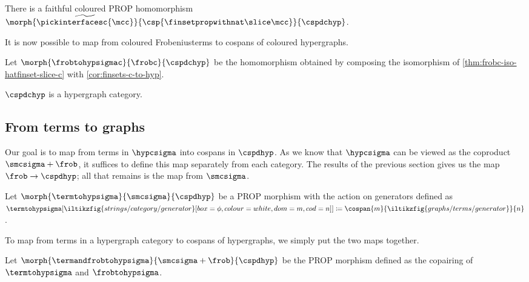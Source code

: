 \begin{corollary}\label{cor:finsets-c-to-hyp}
    There is a faithful coloured PROP homomorphism \(
    \morph{
        \widetilde{\pickinterfacesc{\mcc}}
    }{
        \csp{\finsetpropwithnat \slice \mcc}
    }{
        \cspdchyp
    }
    \).
\end{corollary}

It is now possible to map from coloured Frobeniusterms to cospans of coloured
hypergraphs.

\begin{definition}
    Let \(\morph{\frobtohypsigmac}{\frobc}{\cspdchyp}\) be the homomorphism
    obtained by composing the isomorphism of \cref{thm:frobc-iso-hatfinset-slice-c}
    with \cref{cor:finsets-c-to-hyp}.
\end{definition}

\begin{corollary}
    \(\cspdchyp\) is a hypergraph category.
\end{corollary}

\subsection{From terms to graphs}

Our goal is to map from terms in \(\hypcsigma\) into cospans in \(\cspdhyp\).
As we know that \(\hypcsigma\) can be viewed as the coproduct
\(\smcsigma + \frob\), it suffices to define this map separately from each
category.
The results of the previous section gives us the map \(\frob \to \cspdhyp\);
all that remains is the map from \(\smcsigma\).

\begin{definition}\label{def:hyp-morphisms}
    Let \(\morph{\termtohypsigma}{\smcsigma}{\cspdhyp}\) be a PROP
    morphism with the action on generators defined as \(
    \termtohypsigma[\iltikzfig{%
            strings/category/generator%
        }[box=\phi,colour=white,dom=m,cod=n]
    ]
    \coloneqq
    \cospan{m}{\iltikzfig{graphs/terms/generator}}{n}
    \).
\end{definition}

To map from terms in a hypergraph category to cospans of hypergraphs, we simply
put the two maps together.

\begin{definition}
    Let \(
    \morph{\termandfrobtohypsigma}{\smcsigma + \frob}{\cspdhyp}
    \) be the PROP morphism defined as the copairing of \(\termtohypsigma\) and
    \(\frobtohypsigma\).
\end{definition}

